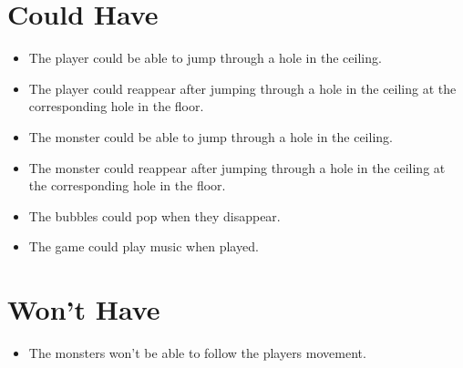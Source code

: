 \section{Could Have}
\begin{itemize}
\itemsep0em
\item The player could be able to jump through a hole in the ceiling.
\item The player could reappear after jumping through a hole in the ceiling at the corresponding hole in the floor.
\item The monster could be able to jump through a hole in the ceiling.
\item The monster could reappear after jumping through a hole in the  ceiling at the corresponding hole in the floor.
\item The bubbles could pop when they disappear.
\item The game could play music when played.
\end{itemize}

\section{Won't Have}
\begin{itemize}
\itemsep0em
\item The monsters won't be able to follow the players movement.
\end{itemize}
